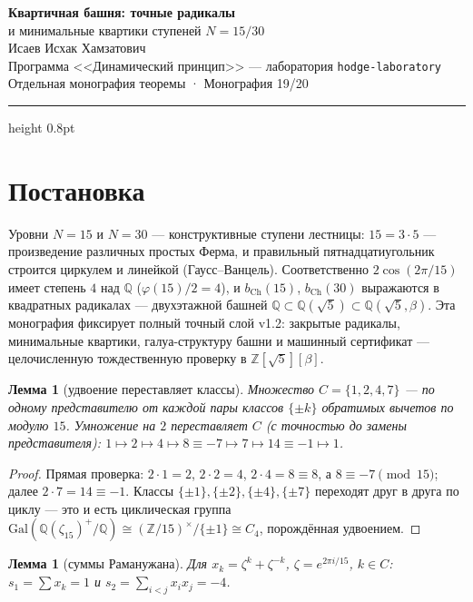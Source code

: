 \documentclass[11pt,a4paper]{article}
\theoremstyle{plain}
\newtheorem{lemma}[theorem]{Лемма}
\theoremstyle{definition}
\theoremstyle{remark}
\newcommand{\ZZ}{\mathbb{Z}}
\newcommand{\QQ}{\mathbb{Q}}
\begin{document}
\begin{center}
{\LARGE\bfseries Квартичная башня: точные радикалы}\\[0.2em]
{\large и минимальные квартики ступеней $N=15/30$}\\[0.6em]
{\normalsize Исаев Исхак Хамзатович}\\[0.2em]
{\small Программа <<Динамический принцип>> --- лаборатория \texttt{hodge-laboratory}}\\[0.15em]
{\small Отдельная монография теоремы · Монография 19/20}
\end{center}
\vspace{0.4em}
{\color{linkblue}\hrule height 0.8pt}
\vspace{0.8em}

\section{Постановка}

Уровни $N=15$ и $N=30$ --- конструктивные ступени лестницы:
$15=3\cdot5$ --- произведение различных простых Ферма, и
правильный пятнадцатиугольник строится циркулем и линейкой
(Гаусс--Ванцель). Соответственно $2\cos(2\pi/15)$ имеет степень
$4$ над $\QQ$ ($\varphi(15)/2=4$), и $b_{\mathrm{Ch}}(15)$, $b_{\mathrm{Ch}}(30)$ выражаются в квадратных радикалах ---
двухэтажной башней $\QQ\subset\QQ(\sqrt5)\subset\QQ(\sqrt5,\beta)$.
Эта монография фиксирует полный точный слой v1.2: закрытые
радикалы, минимальные квартики, галуа-структуру башни и
машинный сертификат --- целочисленную тождественную проверку в
$\ZZ[\sqrt5][\beta]$.

\begin{lemma}[удвоение переставляет классы]\label{th:dbl}
Множество $C=\{1,2,4,7\}$ --- по одному представителю от каждой
пары классов $\{\pm k\}$ обратимых вычетов по модулю $15$.
Умножение на $2$ переставляет $C$ (с точностью до замены
представителя): $1\mapsto2\mapsto4\mapsto8\equiv-7\mapsto7\mapsto14\equiv-1\mapsto1$.
\end{lemma}

\begin{proof}
Прямая проверка: $2\cdot1=2$, $2\cdot2=4$, $2\cdot4=8\equiv8$,
а $8\equiv-7\pmod{15}$; далее $2\cdot7=14\equiv-1$. Классы
$\{\pm1\},\{\pm2\},\{\pm4\},\{\pm7\}$ переходят друг в друга по
циклу --- это и есть циклическая группа
$\mathrm{Gal}(\QQ(\zeta_{15})^+/\QQ)
\cong(\ZZ/15)^\times/\{\pm1\}\cong C_4$, порождённая удвоением.
\end{proof}

\begin{lemma}[суммы Раманужана]\label{th:rams}
Для $x_k=\zeta^k+\zeta^{-k}$, $\zeta=e^{2\pi i/15}$, $k\in C$:
$s_1=\sum x_k=1$ и $s_2=\sum_{i<j}x_ix_j=-4$.
\end{lemma}
\end{document}
